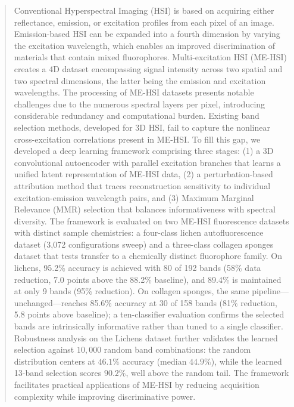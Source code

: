 \begin{abstract}
Conventional Hyperspectral Imaging (HSI) is based on acquiring either reflectance, emission, or excitation profiles from each pixel of an image.
Emission-based HSI can be expanded into a fourth dimension by varying the excitation wavelength, which enables an improved discrimination of materials that contain mixed fluorophores.
Multi-excitation HSI (ME-HSI) creates a 4D dataset encompassing signal intensity across two spatial and two spectral dimensions, the latter being the emission and excitation wavelengths.
The processing of ME-HSI datasets presents notable challenges due to the numerous spectral layers per pixel, introducing considerable redundancy and computational burden.
Existing band selection methods, developed for 3D HSI, fail to capture the nonlinear cross-excitation correlations present in ME-HSI.
To fill this gap, we developed a deep learning framework comprising three stages: (1) a 3D convolutional autoencoder with parallel excitation branches that learns a unified latent representation of ME-HSI data, (2) a perturbation-based attribution method that traces reconstruction sensitivity to individual excitation-emission wavelength pairs, and (3) Maximum Marginal Relevance (MMR) selection that balances informativeness with spectral diversity.
The framework is evaluated on two ME-HSI fluorescence datasets with distinct sample chemistries: a four-class lichen autofluorescence dataset (3{,}072 configurations sweep) and a three-class collagen sponges dataset that tests transfer to a chemically distinct fluorophore family.
On lichens, 95.2\% accuracy is achieved with 80 of 192 bands (58\% data reduction, 7.0 points above the 88.2\% baseline), and 89.4\% is maintained at only 9 bands (95\% reduction).
On collagen sponges, the same pipeline---unchanged---reaches 85.6\% accuracy at 30 of 158 bands (81\% reduction, 5.8 points above baseline); a ten-classifier evaluation confirms the selected bands are intrinsically informative rather than tuned to a single classifier.
Robustness analysis on the Lichens dataset further validates the learned selection against $10{,}000$ random band combinations: the random distribution centers at $46.1\%$ accuracy (median $44.9\%$), while the learned 13-band selection scores $90.2\%$, well above the random tail.
The framework facilitates practical applications of ME-HSI by reducing acquisition complexity while improving discriminative power.
\end{abstract}
